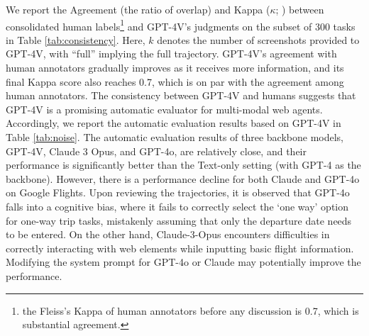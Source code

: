 \documentclass[11pt]{article}
\begin{document}
We report the Agreement (the ratio of overlap) and Kappa ($\kappa$; \citealt{cohen1960coefficient}) between consolidated human labels\footnote{the Fleiss's Kappa \citep{fleiss1971measuring} of human annotators before any discussion is 0.7, which is substantial agreement. } and GPT-4V's judgments on the subset of 300 tasks in Table \ref{tab:consistency}. Here,
$k$ denotes the number of screenshots provided to GPT-4V, with ``full'' implying the full trajectory. GPT-4V's agreement with human annotators gradually improves as it receives more information, and its final Kappa score also reaches 0.7, which is on par with the agreement among human annotators. The consistency between GPT-4V and humans suggests that GPT-4V is a promising automatic evaluator for multi-modal web agents. Accordingly, we report the automatic evaluation results based on GPT-4V in Table \ref{tab:noise}. The automatic evaluation results of three backbone models, GPT-4V, Claude 3 Opus, and GPT-4o, are relatively close, and their performance is significantly better than the Text-only setting (with GPT-4 as the backbone). 
However, there is a performance decline for both Claude and GPT-4o on Google Flights. Upon reviewing the trajectories, it is observed that GPT-4o falls into a cognitive bias, where it fails to correctly select the `one way' option for one-way trip tasks, mistakenly assuming that only the departure date needs to be entered. On the other hand, Claude-3-Opus encounters difficulties in correctly interacting with web elements while inputting basic flight information. Modifying the system prompt for GPT-4o or Claude may potentially improve the performance. 
\end{document}
